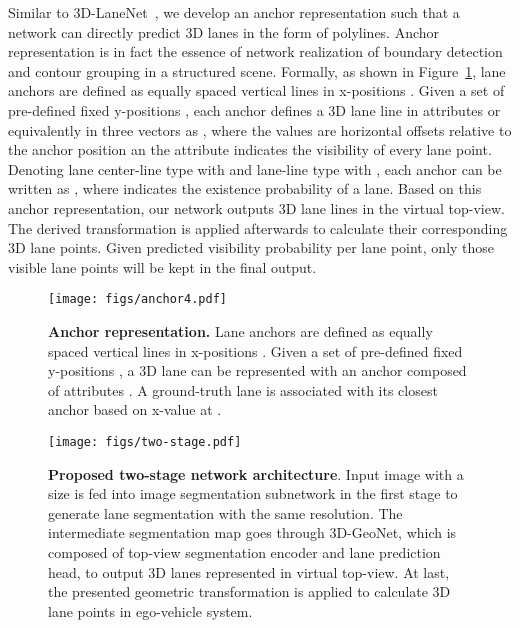 \documentclass[10pt,twocolumn,letterpaper]{article}
\begin{document}
 
Similar to 3D-LaneNet~\cite{Garnett:etal:ICCV2019}, we develop an anchor representation such that a network can directly predict 3D lanes in the form of polylines. Anchor representation is in fact the essence of network realization of boundary detection and contour grouping in a structured scene. Formally, as shown in Figure~\ref{fig:Anchors}, lane anchors are defined as  equally spaced vertical lines in x-positions . Given a set of pre-defined fixed y-positions , each anchor  defines a 3D lane line in  attributes  or equivalently in three vectors as , where the values  are horizontal offsets relative to the anchor position an the attribute  indicates the visibility of every lane point. Denoting lane center-line type with  and lane-line type with , each anchor can be written as , where  indicates the existence probability of a lane. Based on this anchor representation, our network outputs 3D lane lines in the virtual top-view. The derived transformation is applied afterwards to calculate their corresponding 3D lane points. Given predicted visibility probability per lane point, only those visible lane points will be kept in the final output.

\begin{figure}[!h]
  \centering
    \texttt{[image: figs/anchor4.pdf]}
\caption{\textbf{Anchor representation.} Lane anchors are defined as  equally spaced vertical lines in x-positions . Given a set of pre-defined fixed y-positions , a 3D lane can be represented with an anchor  composed of   attributes . A ground-truth lane is associated with its closest anchor based on x-value at .}
  \label{fig:Anchors}
\end{figure}

\begin{figure*}[!h]
  \centering
\texttt{[image: figs/two-stage.pdf]}
  
\caption{\textbf{Proposed two-stage network architecture}. Input image with a size  is fed into image segmentation subnetwork in the first stage to generate lane segmentation with the same resolution. The intermediate segmentation map goes through 3D-GeoNet, which is composed of top-view segmentation encoder and lane prediction head, to output 3D lanes represented in virtual top-view. At last, the presented geometric transformation is applied to calculate 3D lane points in ego-vehicle system.}
  \label{fig:GenLaneNet}
\end{figure*}
\end{document}
